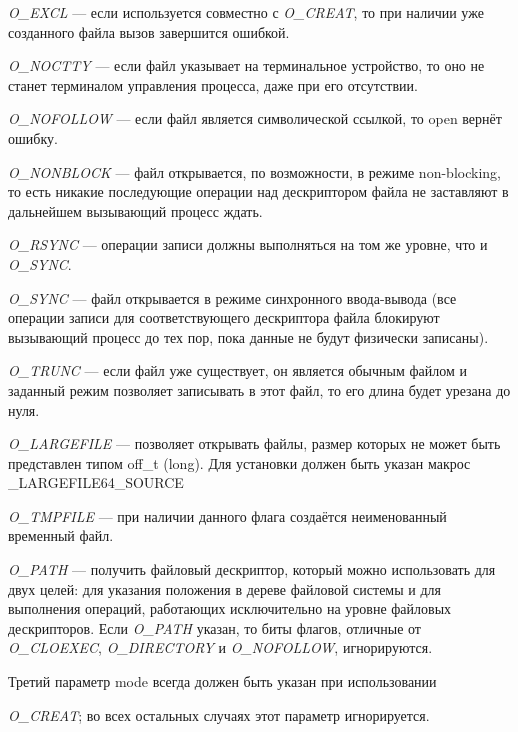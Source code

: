\textit{O\_EXCL} — если используется совместно с \textit{O\_CREAT}, то при наличии уже созданного файла вызов завершится ошибкой.

\textit{O\_NOCTTY} — если файл указывает на терминальное устройство, то оно не станет терминалом управления процесса, даже при его отсутствии.

\textit{O\_NOFOLLOW} — если файл является символической ссылкой, то open вернёт ошибку.

\textit{O\_NONBLOCK} — файл открывается, по возможности, в режиме non-blocking, то есть никакие последующие операции над дескриптором файла не заставляют в дальнейшем вызывающий процесс ждать.

\textit{O\_RSYNC} — операции записи должны выполняться на том же уровне, что и \textit{O\_SYNC}.

\textit{O\_SYNC} — файл открывается в режиме синхронного ввода-вывода (все операции записи для соответствующего дескриптора файла блокируют вызывающий процесс до тех пор, пока данные не будут физически записаны).

\textit{O\_TRUNC} — если файл уже существует, он является обычным файлом и заданный режим позволяет записывать в этот файл, то его длина будет урезана до нуля.

\textit{O\_LARGEFILE} — позволяет открывать файлы, размер которых не может быть представлен типом off\_t (long). Для установки должен быть указан макрос \_LARGEFILE64\_SOURCE

\textit{O\_TMPFILE} — при наличии данного флага создаётся неименованный временный файл.


\textit{O\_PATH} — получить файловый дескриптор, который можно использовать для двух целей: для указания положения в дереве файловой системы и для выполнения операций, работающих исключительно на уровне файловых дескрипторов. Если \textit{O\_PATH} указан, то биты флагов,  отличные от \textit{O\_CLOEXEC}, \textit{O\_DIRECTORY} и \textit{O\_NOFOLLOW}, игнорируются.


Третий параметр mode всегда должен быть указан при использовании 

\noindent\textit{O\_CREAT}; во всех остальных случаях этот параметр игнорируется.

